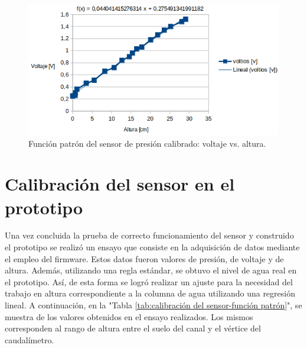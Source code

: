 \begin{figure}
	\centering
	\includegraphics[scale=.85]{./Figures/FuncionPatron-Sensor-VoltajeVsAltura.png}
	\caption{Función patrón del sensor de presión calibrado: voltaje vs. altura.}
	\label{fig:Función patrón del sensor de presión calibrado: voltaje vs. altura}
	\end{figure}
\section{Calibración del sensor en el prototipo
}
\label{sec:Calibración del sensor en el prototipo
}
Una vez concluida la prueba de correcto funcionamiento del sensor y construido el prototipo se realizó un ensayo que consiste en la adquisición de datos mediante el empleo del firmware. Estos datos fueron valores de presión, de voltaje y de altura. Además, utilizando una regla estándar, se obtuvo el nivel de agua real en el prototipo. Así, de esta forma  se logró realizar un ajuste para la necesidad del trabajo en altura correspondiente a la columna de agua utilizando una regresión lineal.
A continuación, en la "Tabla \ref{tab:calibración del sensor-función patrón}", se muestra  de los valores obtenidos en el ensayo realizados. Los mismos corresponden al rango de altura entre el suelo del canal y el vértice del caudalímetro.

